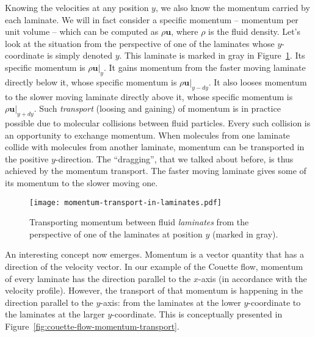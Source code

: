 \documentclass[10pt,twocolumn]{article}
\begin{document}
Knowing the velocities at any position $y$, we also know the momentum carried by each laminate. We will in fact consider a specific momentum -- momentum per unit volume -- which can be computed as $\rho \mathbf{u}$, where $\rho$ is the fluid density. Let's look at the situation from the perspective of one of the laminates whose $y$-coordinate is simply denoted $y$. This laminate is marked in gray in Figure~\ref{fig:momentum-transport-in-laminates}. Its specific momentum is $\rho \mathbf{u}|_{y}$. It gains momentum from the faster moving laminate directly below it, whose specific momentum is $\rho \mathbf{u}|_{y-dy}$. It also looses momentum to the slower moving laminate directly above it, whose specific momentum is $\rho \mathbf{u}|_{y+dy}$. Such \textit{transport} (loosing and gaining) of momentum is in practice possible due to molecular collisions between fluid particles. Every such collision is an opportunity to exchange momentum. When molecules from one laminate collide with molecules from another laminate, momentum can be transported in the positive $y$-direction. The ``dragging'', that we talked about before, is thus achieved by the momentum transport. The faster moving laminate gives some of its momentum to the slower moving one.

\begin{figure}[t!]
\centering\texttt{[image: momentum-transport-in-laminates.pdf]}
\caption{Transporting momentum between fluid \textit{laminates} from the perspective of one of the laminates at position $y$ (marked in gray).}
\label{fig:momentum-transport-in-laminates}
\end{figure}



An interesting concept now emerges. Momentum is a vector quantity that has a direction of the velocity vector. In our example of the Couette flow, momentum of every laminate has the direction parallel to the $x$-axis (in accordance with the velocity profile). However, the transport of that momentum is happening in the direction parallel to the $y$-axis: from the laminates at the lower $y$-coordinate to the laminates at the larger $y$-coordinate. This is conceptually presented in Figure~\ref{fig:couette-flow-momentum-transport}. 
\end{document}
